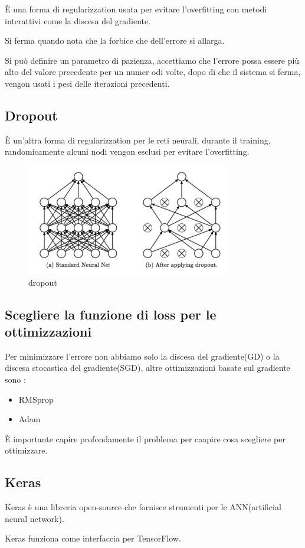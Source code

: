 È una forma di regularizzation usata per evitare l'overfitting con metodi interattivi
come la discesa del gradiente.

Si ferma quando nota che la forbice che dell'errore si allarga.

Si può definire un parametro di pazienza, accettiamo che l'errore possa essere
più alto del valore precedente per un numer odi volte, dopo di che
il sistema si ferma, vengon usati i pesi delle iterazioni precedenti.

\subsection{Dropout}
È un'altra forma di regularizzation per le reti neurali, durante il training,
randomicamente alcuni nodi vengon esclusi per evitare l'overfitting.

\begin{figure}[H]
    \centering
    \includegraphics[width=0.3\linewidth]{imgs/drop-out}
    \caption{dropout}
    \label{fig:dropout}
\end{figure}


\subsection{Scegliere la funzione di loss per le ottimizzazioni}
Per minimizzare l'errore non abbiamo solo la discesa del gradiente(GD) o
la discesa stocastica del gradiente(SGD), altre ottimizzazioni basate sul gradiente
sono :
\begin{itemize}
    \item RMSprop
    \item Adam
\end{itemize}

È importante capire profondamente il problema per caapire cosa scegliere per ottimizzare.

\subsection{Keras}
Keras è una libreria open-source che fornisce strumenti per le ANN(artificial
neural network).

Keras funziona come interfaccia per TensorFlow.





































